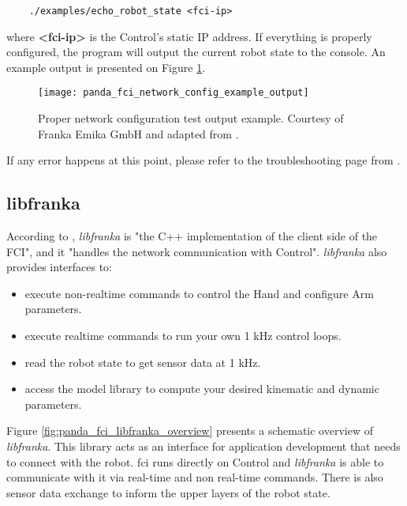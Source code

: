\begin{verbatim}
    ./examples/echo_robot_state <fci-ip>
\end{verbatim}

where \textbf{<fci-ip>} is the Control's static IP address. If everything is properly configured, the program will output the current robot state to the console. An example output is presented on Figure \ref{fig:panda_fci_network_config_example_output}.\\

\begin{figure}[htbp]
    \centering
	\texttt{[image: panda\_fci\_network\_config\_example\_output]}
	\caption{Proper network configuration test output example. Courtesy of Franka Emika GmbH and adapted from \cite{FrankaEmikaGmbH_fci_documentation}.}
	\label{fig:panda_fci_network_config_example_output}
\end{figure}

If any error happens at this point, please refer to the troubleshooting page from \cite{FrankaEmikaGmbH_fci_documentation}.


\subsection{libfranka}
\label{subsec:ros_setup_robotic_system_integration_ros_libfranka}

According to \cite{FrankaEmikaGmbH_fci_documentation}, \textit{libfranka} is "the C++ implementation of the client side of the FCI", and it "handles the network communication with Control". \textit{libfranka} also provides interfaces to:

\begin{itemize}
    \item execute non-realtime commands to control the Hand and configure Arm parameters.
    \item execute realtime commands to run your own 1 kHz control loops.
    \item read the robot state to get sensor data at 1 kHz.
    \item access the model library to compute your desired kinematic and dynamic parameters.
\end{itemize}

Figure \ref{fig:panda_fci_libfranka_overview} presents a schematic overview of \textit{libfranka}. This library acts as an interface for application development that needs to connect with the robot. \gls{fci} runs directly on Control and \textit{libfranka} is able to communicate with it via real-time and non real-time commands. There is also sensor data exchange to inform the upper layers of the robot state.

